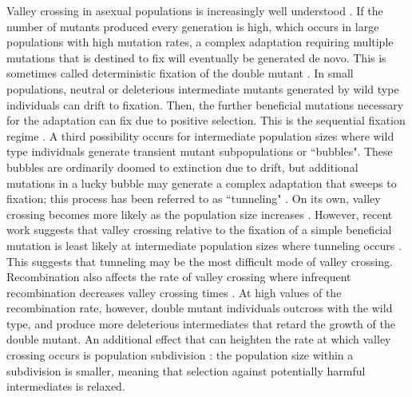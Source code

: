 \documentclass[rmp]{revtex4}
\begin{document}
\begin{spacing}{1.5}
Valley crossing in asexual populations is increasingly well understood \citep{weissman_2009}.
If the number of mutants produced every generation is high, which occurs in large populations with high mutation rates, a complex adaptation requiring multiple mutations that is destined to fix will eventually be generated de novo. This is sometimes called deterministic fixation of the double mutant \citep{weissman_2009}.
In small populations, neutral or deleterious intermediate mutants generated by wild type individuals can drift to fixation. Then, the further beneficial mutations necessary for the adaptation can fix due to positive selection. This is the sequential fixation regime \citep{weissman_2009}.
A third possibility occurs for intermediate population sizes where wild type individuals generate transient mutant subpopulations or ``bubbles".
These bubbles are ordinarily doomed to extinction due to drift, but additional mutations in a lucky bubble may generate a complex adaptation that sweeps to fixation; this process has been referred to as ``tunneling" \citep{iwasa_2004, weissman_2009}.
On its own, valley crossing becomes more likely as the population size increases \citep{weissman_2009}. However, recent work suggests that valley crossing relative to the fixation of a simple beneficial mutation is least likely at intermediate population sizes where tunneling occurs \citet{ochs_2015}. This suggests that tunneling may be the most difficult mode of valley crossing. 
Recombination also affects the rate of valley crossing where infrequent recombination decreases valley crossing times \citep{weissman_2010}.
At high values of the recombination rate, however, double mutant individuals outcross with the wild type, and produce more deleterious intermediates that retard the growth of the double mutant.
An additional effect that can heighten the rate at which valley crossing occurs is population subdivision \citep{Bitbol:Schwab:2014}: the population size within a subdivision is smaller, meaning that selection against potentially harmful intermediates is relaxed.


\end{spacing}
\end{document}
